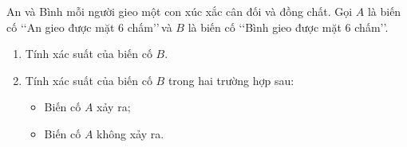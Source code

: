 \begin{bt}%
	An và Bình mỗi người gieo một con xúc xắc cân đối và đồng chất. Gọi $A$ là biến cố \lq\lq  An gieo được mặt $6$ chấm\rq\rq $\,$và $B$ là biến cố \lq\lq  Bình gieo được mặt $6$ chấm\rq\rq.
	\begin{enumerate}
		\item Tính xác suất của biến cố $B$.
		\item Tính xác suất của biến cố $B$ trong hai trường hợp sau:
		\begin{itemize}
			\item Biến cố $A$ xảy ra;
			\item Biến cố $A$ không xảy ra.
		\end{itemize}
	\end{enumerate}
\end{bt}


